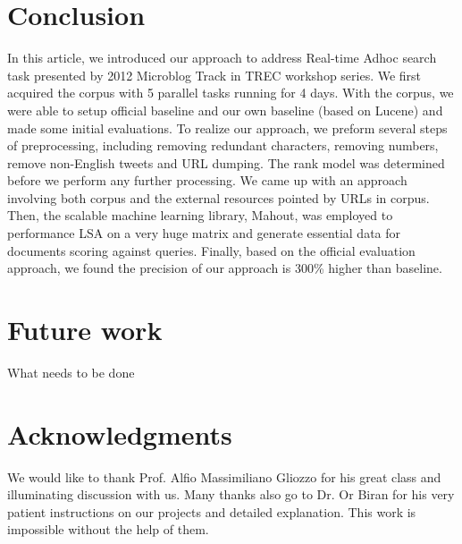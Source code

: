 \documentclass{acm_proc_article-sp}
\begin{document}
\section{Conclusion}
In this article, we introduced our approach to address Real-time Adhoc search task presented by 2012 Microblog Track in TREC workshop series. We first acquired the corpus with 5 parallel tasks running for 4 days. With the corpus, we were able to setup official baseline and our own baseline (based on Lucene) and made some initial evaluations. To realize our approach, we preform several steps of preprocessing, including removing redundant characters, removing numbers, remove non-English tweets and URL dumping. The rank model was determined before we perform any further processing. We came up with an approach involving both corpus and the external resources pointed by URLs in corpus. Then, the scalable machine learning library, Mahout, was employed to performance LSA on a very huge matrix and generate essential data for documents scoring against queries. Finally, based on the official evaluation approach, we found the precision of our approach is 300\% higher than baseline.

\section{Future work}
What needs to be done

\section{Acknowledgments}
We would like to thank Prof. Alfio Massimiliano Gliozzo for his great class and illuminating discussion with us. Many thanks also go to Dr. Or Biran for his very patient instructions on our projects and detailed explanation. This work is impossible without the help of them. 



\balancecolumns
\end{document}
